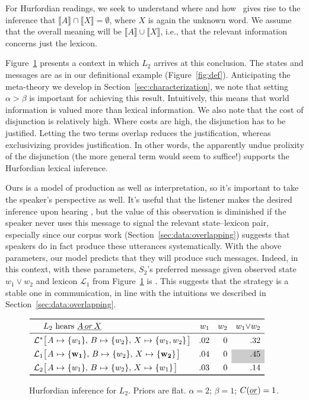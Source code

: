 \documentclass[12pt,twoside]{article}
\makeatletter
\newcommand{\secref}[1]{Section~\ref{#1}}
\newcommand{\Figref}[1]{Figure~\ref{#1}}
\newcommand{\figref}[1]{Figure~\ref{#1}}
\newcommand{\word}[1]{\emph{#1}}
\newcommand{\set}[1]{\ensuremath{\left\{ #1 \right\}}}
\newcommand{\sem}[1]{\ensuremath{\llbracket#1\rrbracket}}
\newcommand{\Lex}{\mathcal{L}}
\newcommand{\LexStar}{\Lex^{\ast}}
\newcommand{\Costs}{C}
\newcommand{\SpeakerK}[1][k]{S_{#1}}
\newcommand{\ListenerK}[1][k]{L_{#1}}
\newcommand{\hurford}[1]{\mathbf{#1}}
\newcommand{\graycell}[1]{{\cellcolor[gray]{.8}#1}}
\newcommand{\smalldisjlex}[3]{
  \setlength{\arraycolsep}{1pt}
  \left[
    \begin{array}[c]{l@{ \ \mapsto \ }r@{, \ } l@{ \ \mapsto \ }r@{, \ } l@{ \ \mapsto \ }r}
      A & \set{#1} &
      B & \set{#2} &
      X & \set{#3}
    \end{array}
  \right]}
\newcommand{\smalldisjlexTargetHuford}{\smalldisjlex{\hurford{w_{1}}}{w_{2}}{\hurford{w_{2}}}}
\renewcommand{\_}{\textbf{\textunderscore\hspace{-4pt}\textunderscore\hspace{-3pt}\textunderscore\hspace{-4pt}\textunderscore}\hspace{0.5pt}}			%
\makeatother
\begin{document}
For Hurfordian readings, we seek to understand where and how
\AorX\ gives rise to the inference that
$\sem{A} \cap \sem{X} = \emptyset$, where $X$ is again the unknown
word.  We assume that the overall meaning will be
$\sem{A} \cup \sem{X}$, i.e., that the relevant information concerns
just the lexicon.

\Figref{fig:hurford} presents a context in which $\ListenerK[2]$
arrives at this conclusion. The states and messages are as in our
definitional example (\figref{fig:def}). Anticipating the meta-theory
we develop in \secref{sec:characterization}, we note that setting
$\alpha > \beta$ is important for achieving this result. Intuitively,
this means that world information is valued more than lexical
information. We also note that the cost of disjunction is relatively
high. Where costs are high, the disjunction has to be
justified. Letting the two terms overlap reduces the justification,
whereas exclusivizing provides justification. In other words, the
apparently undue prolixity of the disjunction (the more general term
would seem to suffice!) supports the Hurfordian lexical inference.

Ours is a model of production as well as interpretation, so it's
important to take the speaker's perspective as well. It's useful that
the listener makes the desired inference upon hearing \AorX,
but the value of this observation is diminished if the speaker never
uses this message to signal the relevant state--lexicon pair,
especially since our corpus work (\secref{sec:data:overlapping})
suggests that speakers do in fact produce these utterances
systematically. With the above parameters, our model predicts that
they will produce such messages. Indeed, in this context, with these
parameters, $\SpeakerK[2]$'s preferred message given observed state
$w_{1}{\vee} w_{2}$ and lexicon $\Lex_{1}$ from \figref{fig:hurford}
is \AorX.  This suggests that the strategy is a stable one in
communication, in line with the intuitions we described in
\secref{sec:data:overlapping}.

\begin{figure}[tp]
\centering
\setlength{\tabcolsep}{4pt}
\setlength{\arraycolsep}{2pt}
$\begin{array}[c]{l@{ }l r r r}
\toprule
& \ListenerK[2] \text{ hears } \AorX       & w_{1} & w_{2} & w_{1}{\vee}w_{2} \\
\midrule
\LexStar & \smalldisjlex{w_{1}}{w_{2}}{w_{1}, w_{2}}  & .02 & 0 & .32 \\[1ex]
\Lex_{1} & \smalldisjlexTargetHuford                 & .04 & 0 & \graycell{.45} \\[1ex]
\Lex_{2} & \smalldisjlex{w_{1}}{w_{2}}{w_{1}}         & .03 & 0 & .14 \\
\bottomrule
\end{array}$
\caption{Hurfordian inference for $\ListenerK[2]$.
Priors are flat. 
$\alpha = 2$; 
$\beta = 1$; 
$\Costs(\word{or}) = 1$.}
\label{fig:hurford}
\end{figure}
\end{document}
